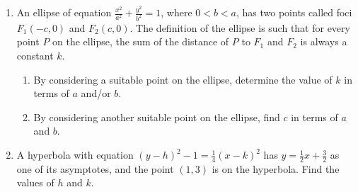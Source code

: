 \begin{problem}[\chili]
    \begin{enumerate}
        \item An ellipse of equation $\frac{x^{2}}{a^{2}}+\frac{y^{2}}{b^{2}}=1$, where $0<b<a$, has two points called foci $F_1(-c, 0)$ and $F_2(c, 0)$. The definition of the ellipse is such that for every point $P$ on the ellipse, the sum of the distance of $P$ to $F_1$ and $F_2$ is always a constant $k$.
        \begin{enumerate}
            \item By considering a suitable point on the ellipse, determine the value of $k$ in terms of $a$ and/or $b$.
            \item By considering another suitable point on the ellipse, find $c$ in terms of $a$ and $b$.
        \end{enumerate}
        \item A hyperbola with equation $(y-h)^2 - 1 =\frac14(x-k)^2$ has $y=\frac12 x+\frac32$ as one of its asymptotes, and the point $(1,3)$ is on the hyperbola. Find the values of $h$ and $k$.
    \end{enumerate}
\end{problem}